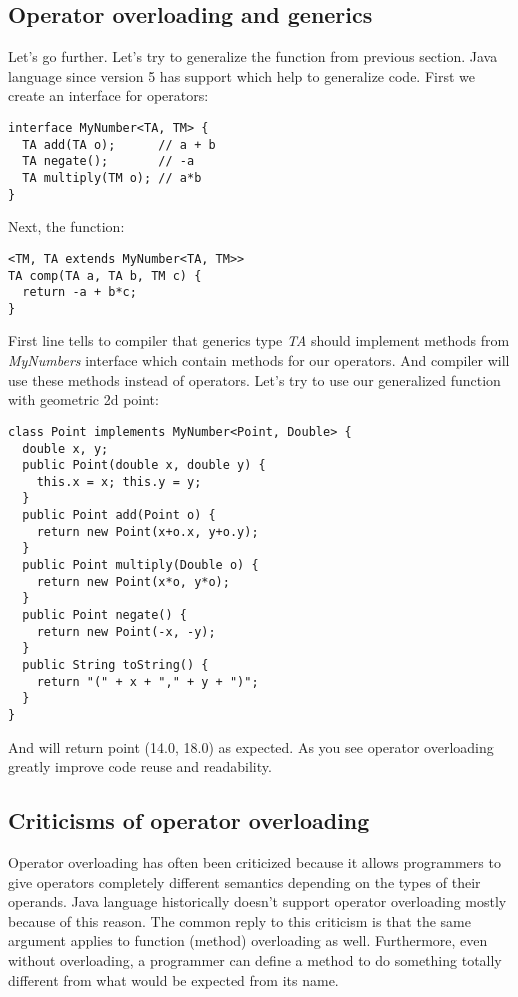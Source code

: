 \documentclass{aircc}
\begin{document}
\subsection{Operator overloading and generics}
Let's go further. 
Let's try to generalize the  function from previous section.
Java language since version 5 has  support which help to generalize code.
First we create an interface for operators:
\begin{lstlisting}
interface MyNumber<TA, TM> {
  TA add(TA o);      // a + b
  TA negate();       // -a
  TA multiply(TM o); // a*b
}
\end{lstlisting}
Next, the  function:
\begin{lstlisting}
<TM, TA extends MyNumber<TA, TM>>
TA comp(TA a, TA b, TM c) {
  return -a + b*c;
}
\end{lstlisting}
First line tells to compiler that generics type \textit{TA} should implement methods from \textit{MyNumbers} interface which contain methods for our operators. And compiler will use these methods instead of operators.
Let's try to use our generalized function with geometric 2d point:
\begin{lstlisting}
class Point implements MyNumber<Point, Double> {
  double x, y;
  public Point(double x, double y) {
    this.x = x; this.y = y;
  }
  public Point add(Point o) {
    return new Point(x+o.x, y+o.y);
  }
  public Point multiply(Double o) {
    return new Point(x*o, y*o);
  }
  public Point negate() {
    return new Point(-x, -y);
  }
  public String toString() {
    return "(" + x + "," + y + ")";
  }
}
\end{lstlisting}
And  will return point (14.0, 18.0) as expected.
As you see operator overloading greatly improve code reuse and readability.

\subsection{Criticisms of operator overloading}
Operator overloading has often been criticized because it allows programmers to give operators completely different semantics depending on the types of their operands.
Java language historically doesn't support operator overloading mostly because of this reason.
The common reply to this criticism is that the same argument applies to function (method) overloading as well. 
Furthermore, even without overloading, a programmer can define a method to do something totally different from what would be expected from its name.
\end{document}
